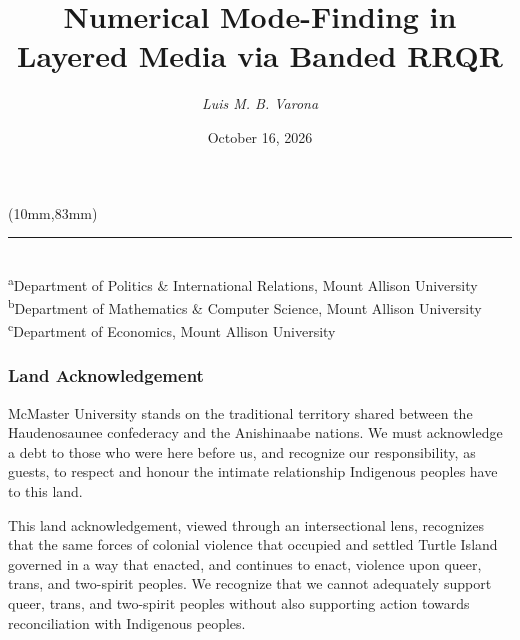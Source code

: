 \documentclass[xcolor=svgnames]{beamer}
\title[Mode-Finding via Banded RRQR]{Numerical Mode-Finding in Layered Media via Banded RRQR}
\author[Luis M. B. Varona]{\emph{Luis M. B. Varona}\inst{a,b,c}}
\institute[MtA]{
  61\textsuperscript{st} Canadian Undergraduate Physics Conference \\
  McMaster University, Hamilton, ON
}
\date[October 16, 2026]{October 16, 2026}
\newenvironment{reference}[2]{%
  \begin{textblock*}{\textwidth}(#1,#2)
  \footnotesize\it\bgroup\color{DeepBlue}}{\egroup
\end{textblock*}}
\begin{document}
{
    \begin{frame}
        \vspace*{-0.8cm}
        \titlepage
        \begin{reference}{10mm}{83mm}
            \rule{4cm}{0.5pt} \\
            \scriptsize
            \textsuperscript{a}Department of Politics \& International Relations, Mount Allison University \\
            \textsuperscript{b}Department of Mathematics \& Computer Science, Mount Allison University \\
            \textsuperscript{c}Department of Economics, Mount Allison University \par
        \end{reference}
    \end{frame}
}
\addtocounter{framenumber}{-1}	%

\begin{frame}
    \frametitle{Land Acknowledgement}
    McMaster University stands on the traditional territory shared between the Haudenosaunee confederacy and the Anishinaabe nations. We must acknowledge a debt to those who were here before us, and recognize our responsibility, as guests, to respect and honour the intimate relationship Indigenous peoples have to this land. \vfill
    
    This land acknowledgement, viewed through an intersectional lens, recognizes that the same forces of colonial violence that occupied and settled Turtle Island governed in a way that enacted, and continues to enact, violence upon queer, trans, and two-spirit peoples. We recognize that we cannot adequately support queer, trans, and two-spirit peoples without also supporting action towards reconciliation with Indigenous peoples.
\end{frame}
\end{document}
